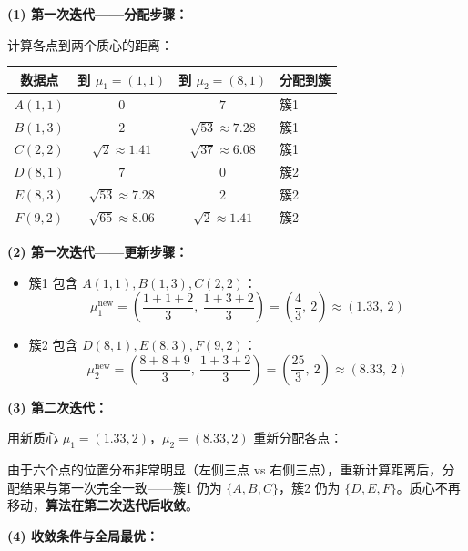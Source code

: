 \documentclass[a4paper,11pt]{ctexart}
\begin{document}
\begin{solutionbox}[参考答案与详细解析]
    \textbf{(1) 第一次迭代——分配步骤：}

    计算各点到两个质心的距离：

    \begin{center}
    \begin{tabular}{cccl}
        \toprule
        数据点 & 到 $\mu_1=(1,1)$ & 到 $\mu_2=(8,1)$ & 分配到簇 \\
        \midrule
        $A(1,1)$ & $0$ & $7$ & 簇1 \\
        $B(1,3)$ & $2$ & $\sqrt{53}\approx7.28$ & 簇1 \\
        $C(2,2)$ & $\sqrt{2}\approx1.41$ & $\sqrt{37}\approx6.08$ & 簇1 \\
        $D(8,1)$ & $7$ & $0$ & 簇2 \\
        $E(8,3)$ & $\sqrt{53}\approx7.28$ & $2$ & 簇2 \\
        $F(9,2)$ & $\sqrt{65}\approx8.06$ & $\sqrt{2}\approx1.41$ & 簇2 \\
        \bottomrule
    \end{tabular}
    \end{center}

    \textbf{(2) 第一次迭代——更新步骤：}

    \begin{itemize}
        \item 簇1 包含 $A(1,1), B(1,3), C(2,2)$：
        \[
        \mu_1^{\text{new}} = \left(\frac{1+1+2}{3},\ \frac{1+3+2}{3}\right) = \left(\frac{4}{3},\ 2\right) \approx (1.33,\ 2)
        \]
        \item 簇2 包含 $D(8,1), E(8,3), F(9,2)$：
        \[
        \mu_2^{\text{new}} = \left(\frac{8+8+9}{3},\ \frac{1+3+2}{3}\right) = \left(\frac{25}{3},\ 2\right) \approx (8.33,\ 2)
        \]
    \end{itemize}

    \textbf{(3) 第二次迭代：}

    用新质心 $\mu_1=(1.33, 2)$，$\mu_2=(8.33, 2)$ 重新分配各点：

    由于六个点的位置分布非常明显（左侧三点 vs 右侧三点），重新计算距离后，分配结果与第一次完全一致——簇1 仍为 $\{A,B,C\}$，簇2 仍为 $\{D,E,F\}$。质心不再移动，\textbf{算法在第二次迭代后收敛}。

    \textbf{(4) 收敛条件与全局最优：}


\end{solutionbox}
\end{document}

